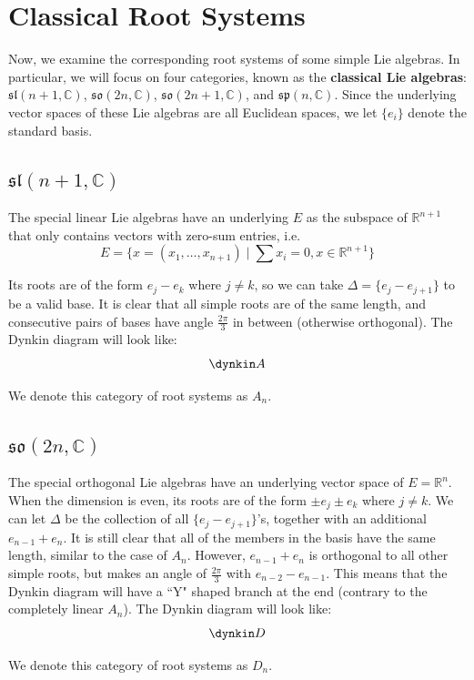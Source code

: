 \documentclass{article}
\theoremstyle{definition}
\begin{document}
\section{Classical Root Systems}
\quad Now, we examine the corresponding root systems of some simple Lie algebras. In particular, we will focus on four categories, known as the \textbf{classical Lie algebras}: $\mathfrak{sl}(n+1,\mathbb{C})$, $\mathfrak{so}(2n,\mathbb{C})$, $\mathfrak{so}(2n+1,\mathbb{C})$, and $\mathfrak{sp}(n,\mathbb{C})$. Since the underlying vector spaces of these Lie algebras are all Euclidean spaces, we let $\{e_i\}$ denote the standard basis. 
\subsection{$\mathfrak{sl}(n+1,\mathbb{C})$}
\quad The special linear Lie algebras have an underlying $E$ as the subspace of $\mathbb{R}^{n+1}$ that only contains vectors with zero-sum entries, i.e.
$$E=\{x=(x_1,\dots,x_{n+1})\mid\sum x_i=0, x\in\mathbb{R}^{n+1}\}$$

Its roots are of the form $e_j - e_k$ where $j\neq k$, so we can take $\Delta=\{e_j-e_{j+1}\}$ to be a valid base. It is clear that all simple roots are of the same length, and consecutive pairs of bases have angle $\frac{2\pi}{3}$ in between (otherwise orthogonal). The Dynkin diagram will look like: 
$$\dynkin A{}$$

We denote this category of root systems as $A_n$. 
\subsection{$\mathfrak{so}(2n,\mathbb{C})$}
\quad The special orthogonal Lie algebras have an underlying vector space of $E=\mathbb{R}^n$. When the dimension is even, its roots are of the form $\pm e_j \pm e_k$ where $j\neq k$. We can let $\Delta$ be the collection of all $\{e_j-e_{j+1}\}$'s, together with  an additional $e_{n-1}+e_n$. It is still clear that all of the members in the basis have the same length, similar to the case of $A_n$. However, $e_{n-1}+e_n$ is orthogonal to all other simple roots, but makes an angle of $\frac{2\pi}{3}$ with $e_{n-2}-e_{n-1}$. This means that the Dynkin diagram will have a ``Y" shaped branch at the end (contrary to the completely linear $A_n$). The Dynkin diagram will look like: 
$$\dynkin D{}$$

We denote this category of root systems as $D_n$. 
\end{document}
